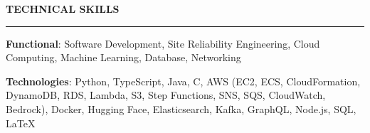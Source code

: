 \documentclass{cv}
\begin{document}

\sectionskip


\textbf{\uppercase{Technical Skills}}
\sectionlineskip
\hrule height 0.6pt
\begin{list}{}{\setlength{\leftmargin}{0pt}}
\itemsep -3.0pt
\item
    \textbf{Functional}: Software Development, Site Reliability Engineering, Cloud Computing, Machine Learning, Database, Networking
\item
    \textbf{Technologies}: Python, TypeScript, Java, C, AWS (EC2, ECS, CloudFormation, DynamoDB, RDS, Lambda, S3, Step Functions, SNS, SQS, CloudWatch, Bedrock), Docker, Hugging Face, Elasticsearch, Kafka, GraphQL, Node.js, SQL, \LaTeX
\end{list}


\sectionskip

\end{document}
